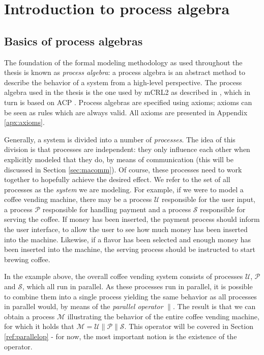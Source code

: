 \chapter{Introduction to process algebra}


\section{Basics of process algebras}
\label{sec:pabasics}

The foundation of the formal modeling methodology as used throughout the thesis is known as \emph{process algebra}: a process algebra is an abstract method to describe the behavior of a system from a high-level perspective. The process algebra used in the thesis is the one used by mCRL2 \cite{groote07mcrl2} as described in \cite{groote07radv}, which in turn is based on ACP \cite{bergstra84acp}. Process algebras are specified using axioms; axioms can be seen as rules which are always valid. All axioms are presented in Appendix \ref{apx:axioms}.

Generally, a system is divided into a number of \emph{processes}. The idea of this division is that processes are independent: they only influence each other when explicitly modeled that they do, by means of communication (this will be discussed in Section \ref{sec:macomm}). Of course, these processes need to work together to hopefully achieve the desired effect. We refer to the set of all processes as the \emph{system} we are modeling. For example, if we were to model a coffee vending machine, there may be a process $\mathcal{U}$ responsible for the user input, a process $\mathcal{P}$ responsible for handling payment and a process $\mathcal{S}$ responsible for serving the coffee. If money has been inserted, the payment process should inform the user interface, to allow the user to see how much money has been inserted into the machine. Likewise, if a flavor has been selected and enough money has been inserted into the machine, the serving process should be instructed to start brewing coffee.

In the example above, the overall coffee vending system consists of processes $\mathcal{U}$, $\mathcal{P}$ and $\mathcal{S}$, which all run in parallel. As these processes run in parallel, it is possible to combine them into a single process yielding the same behavior as all processes in parallel would, by means of the \emph{parallel operator} $\parallel$. The result is that we can obtain a process $\mathcal{M}$ illustrating the behavior of the entire coffee vending machine, for which it holds that $\mathcal{M} = \mathcal{U} \parallel \mathcal{P} \parallel \mathcal{S}$. This operator will be covered in Section \ref{ref:parallelop} - for now, the most important notion is the existence of the operator.

